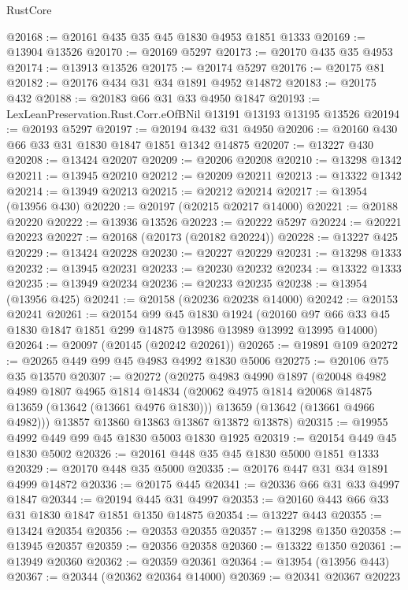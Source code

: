 \begin{lexlean}{RustCore}
\begin{coremodule}
@20168 := @20161 @435 @35 @45 @1830 @4953 @1851 @1333
@20169 := @13904 @13526
@20170 := @20169 @5297
@20173 := @20170 @435 @35 @4953
@20174 := @13913 @13526
@20175 := @20174 @5297
@20176 := @20175 @81
@20182 := @20176 @434 @31 @34 @1891 @4952 @14872
@20183 := @20175 @432
@20188 := @20183 @66 @31 @33 @4950 @1847
@20193 := LexLeanPreservation.Rust.Corr.eOfBNil @13191 @13193 @13195 @13526
@20194 := @20193 @5297
@20197 := @20194 @432 @31 @4950
@20206 := @20160 @430 @66 @33 @31 @1830 @1847 @1851 @1342 @14875
@20207 := @13227 @430
@20208 := @13424 @20207
@20209 := @20206 @20208
@20210 := @13298 @1342
@20211 := @13945 @20210
@20212 := @20209 @20211
@20213 := @13322 @1342
@20214 := @13949 @20213
@20215 := @20212 @20214
@20217 := @13954 (@13956 @430)
@20220 := @20197 (@20215 @20217 @14000)
@20221 := @20188 @20220
@20222 := @13936 @13526
@20223 := @20222 @5297
@20224 := @20221 @20223
@20227 := @20168 (@20173 (@20182 @20224))
@20228 := @13227 @425
@20229 := @13424 @20228
@20230 := @20227 @20229
@20231 := @13298 @1333
@20232 := @13945 @20231
@20233 := @20230 @20232
@20234 := @13322 @1333
@20235 := @13949 @20234
@20236 := @20233 @20235
@20238 := @13954 (@13956 @425)
@20241 := @20158 (@20236 @20238 @14000)
@20242 := @20153 @20241
@20261 := @20154
    @99
    @45
    @1830
    @1924
    (@20160 @97 @66 @33 @45 @1830 @1847 @1851 @299 @14875 @13986 @13989 @13992 @13995 @14000)
@20264 := @20097 (@20145 (@20242 @20261))
@20265 := @19891 @109
@20272 := @20265 @449 @99 @45 @4983 @4992 @1830 @5006
@20275 := @20106 @75 @35 @13570
@20307 := @20272
    (@20275
      @4983
      @4990
      @1897
      (@20048
        @4982
        @4989
        @1807
        @4965
        @1814
        @14834
        (@20062 @4975 @1814 @20068 @14875 @13659 (@13642 (@13661 @4976 @1830)))
        @13659
        (@13642 (@13661 @4966 @4982)))
      @13857
      @13860
      @13863
      @13867
      @13872
      @13878)
@20315 := @19955 @4992 @449 @99 @45 @1830 @5003 @1830 @1925
@20319 := @20154 @449 @45 @1830 @5002
@20326 := @20161 @448 @35 @45 @1830 @5000 @1851 @1333
@20329 := @20170 @448 @35 @5000
@20335 := @20176 @447 @31 @34 @1891 @4999 @14872
@20336 := @20175 @445
@20341 := @20336 @66 @31 @33 @4997 @1847
@20344 := @20194 @445 @31 @4997
@20353 := @20160 @443 @66 @33 @31 @1830 @1847 @1851 @1350 @14875
@20354 := @13227 @443
@20355 := @13424 @20354
@20356 := @20353 @20355
@20357 := @13298 @1350
@20358 := @13945 @20357
@20359 := @20356 @20358
@20360 := @13322 @1350
@20361 := @13949 @20360
@20362 := @20359 @20361
@20364 := @13954 (@13956 @443)
@20367 := @20344 (@20362 @20364 @14000)
@20369 := @20341 @20367 @20223

\end{coremodule}
\end{lexlean}
